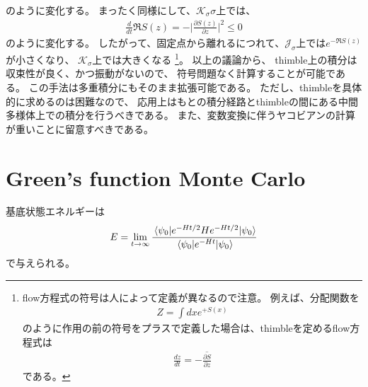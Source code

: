 \documentclass[]{ltjsarticle}
\newcommand{\del}{\partial}
\newcommand{\calJ}{\mathcal{J}}
\newcommand{\calK}{\mathcal{K}}
\begin{document}
のように変化する。
まったく同様にして、$\calK_\sigma\sigma$上では、
\begin{align}
	\frac{d}{dt} \Re S(z)
	=-\Bigg| \frac{\del S(z)}{\del z} \Bigg|^2 \leq 0
\end{align}
のように変化する。
したがって、固定点から離れるにつれて、$\calJ_\sigma$上では$e^{-\Re S(z)}$が小さくなり、
$\calK_\sigma$上では大きくなる
\footnote{
	flow方程式の符号は人によって定義が異なるので注意。
	例えば、分配関数を
	\begin{align}
		Z = \int dx e^{+S(x)}
	\end{align}
	のように作用の前の符号をプラスで定義した場合は、thimbleを定めるflow方程式は
	\begin{align}
		\frac{d z}{d t} = -\overline{\frac{\del S}{\del z}}
	\end{align}
	である。
}。
以上の議論から、
thimble上の積分は収束性が良く、かつ振動がないので、
符号問題なく計算することが可能である。
この手法は多重積分にもそのまま拡張可能である。
ただし、thimbleを具体的に求めるのは困難なので、
応用上はもとの積分経路とthimbleの間にある中間多様体上での積分を行うべきである。
また、変数変換に伴うヤコビアンの計算が重いことに留意すべきである。



\section{Green's function Monte Carlo}
基底状態エネルギーは
\begin{align}
    E = \lim_{t\to \infty} 
    \frac{\ev{e^{-Ht/2}He^{-Ht/2}}{\psi_0}}{\ev{e^{-Ht}}{\psi_0}}
\end{align}    
で与えられる。



\end{document}
